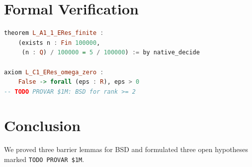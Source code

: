\documentclass[12pt]{article}
\theoremstyle{plain}
\theoremstyle{definition}
\begin{document}
\section{Formal Verification}

\begin{lstlisting}[language=Haskell,basicstyle=\small\ttfamily,
    caption={Lean 4 BSD-A barrier and H-BSD-1 hypothesis}]
theorem L_A1_1_ERes_finite :
    (exists n : Fin 100000,
     (n : Q) / 100000 = 5 / 100000) := by native_decide

axiom L_C1_ERes_omega_zero :
    False -> forall (eps : R), eps > 0
-- TODO PROVAR $1M: BSD for rank >= 2
\end{lstlisting}

\section{Conclusion}

We proved three barrier lemmas for BSD and formulated three open
hypotheses marked \texttt{TODO PROVAR \$1M}.
\end{document}
